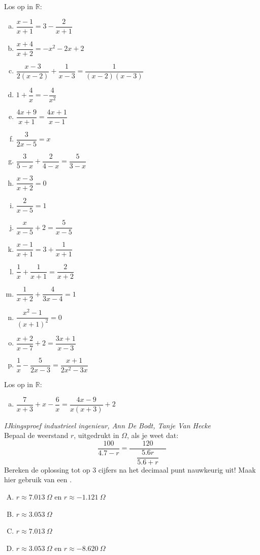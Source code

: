 \documentclass[a4paper,12pt]{article}
\begin{document}
\begin{oefening} %
Los op in $\mathbb{R}$:
\begin{multicols}{2}
\begin{enumerate}[(a)]
  \itemsep0.4em
  \item $\dfrac{x-1}{x+1}=3-\dfrac{2}{x+1}$
  \item $\dfrac{x+4}{x+2}=-x^2-2x+2$
  \item $\dfrac{x-3}{2(x-2)}+\dfrac{1}{x-3}=\dfrac{1}{(x-2)(x-3)}$
  \item $1+\dfrac{4}{x}=-\dfrac{4}{x^2}$
  \item $\dfrac{4x+9}{x+1}=\dfrac{4x+1}{x-1}$
  \item $\dfrac{3}{2x-5}=x$
  \item $\dfrac{3}{5-x}+\dfrac{2}{4-x}=\dfrac{5}{3-x}$
  \item $\dfrac{x-3}{x+2}=0$
  \item $\dfrac{2}{x-5}=1$
  \item $\dfrac{x}{x-5}+2=\dfrac{5}{x-5}$
  \item $\dfrac{x-1}{x+1}=3+\dfrac{1}{x+1}$
  \item $\dfrac{1}{x}+\dfrac{1}{x+1}=\dfrac{2}{x+2}$
  \item $\dfrac{1}{x+2}+\dfrac{4}{3x-4}=1$
  \item $\dfrac{x^2-1}{(x+1)^2}=0$
  \item $\dfrac{x+2}{x-7}+2=\dfrac{3x+1}{x-3}$
  \item $\dfrac{1}{x}-\dfrac{5}{2x-3}=\dfrac{x+1}{2x^2-3x}$
\end{enumerate}
\end{multicols}
\end{oefening}

\begin{oefening} %
Los op in $\mathbb{R}$:\\
\begin{enumerate}[(a)]
  \itemsep.4em
  \item $\dfrac{7}{x+3} + x - \dfrac{6}{x} = \dfrac{4x-9}{x(x+3)} + 2$
\end{enumerate}
\end{oefening}

\begin{oefening}{\scriptsize\em IJkingsproef industrieel ingenieur, Ann De Bodt, Tanje Van Hecke}\\
Bepaal de weerstand $r$, uitgedrukt in $\Omega$, als je weet dat:
$$\dfrac{100}{4.7-r}=\dfrac{120}{\quad\dfrac{5.6r}{5.6+r}\quad}$$
Bereken de oplossing tot op 3 cijfers na het decimaal punt nauwkeurig uit!
Maak hier gebruik van een .
\begin{enumerate}[(A)]
  \itemsep.5em
  \item $r \approx 7.013\ \Omega$ en $r \approx -1.121\ \Omega$
  \item $r \approx 3.053\ \Omega$
  \item $r \approx 7.013\ \Omega$
  \item $r \approx 3.053\ \Omega$ en $r \approx -8.620\ \Omega$
\end{enumerate}
\end{oefening}
\end{document}
